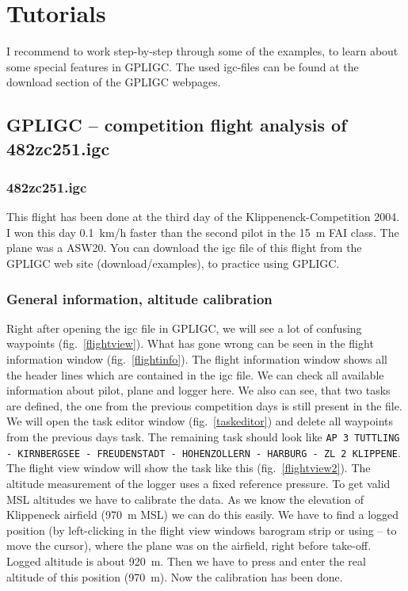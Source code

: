 \section{Tutorials}

I recommend to work step-by-step through some of the examples, to learn about some special features in GPLIGC.
The used igc-files can be found at the download section of the GPLIGC webpages.

\subsection{GPLIGC -- competition flight analysis  of 482zc251.igc}

\subsubsection{482zc251.igc}
This flight has been done at the third day of the Klippenenck-Competition 2004.
I won this day 0.1~km/h faster than the second pilot in the 15~m FAI class. The plane was a ASW20.
You can download the igc file of this flight from the GPLIGC web site (download/examples), to practice using GPLIGC.

\subsubsection{General information, altitude calibration}
Right after opening the igc file in GPLIGC, we will see a lot of confusing waypoints (fig.~\ref{flightview}).
What has gone wrong can be seen in the flight information window (fig.~\ref{flightinfo}).
The flight information window shows all the header lines which are contained in the igc file.
We can check all available information about pilot, plane and logger here.
We also can see, that two tasks are defined, the one from the previous competition days is still present in the file.
We will open the task editor window (fig.~\ref{taskeditor}) and delete all waypoints from the previous days task.
The remaining task should look like \texttt{AP 3 TUTTLING - KIRNBERGSEE - FREUDENSTADT - HOHENZOLLERN - HARBURG - ZL 2 KLIPPENE}.
The flight view window will show the task like this (fig.~\ref{flightview2}).
The altitude measurement of the logger uses a fixed reference pressure.
To get valid MSL altitudes we have to calibrate the data.
As we know the elevation of Klippeneck airfield (970~m MSL) we can do this easily.
We have to find a logged position (by left-clicking in the flight view windows barogram strip or using -- to move the cursor),
where the plane was on the airfield, right before take-off. Logged altitude is about 920~m.
Then we have to press  and enter the real altitude of this position (970~m).
Now the calibration has been done.

